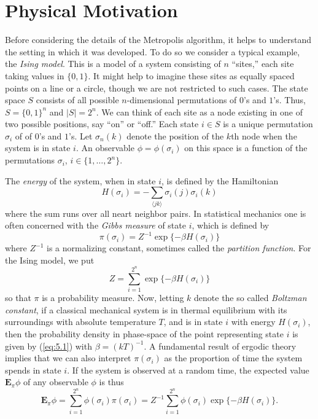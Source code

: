 \documentclass[12pt,letterpaper]{report}
\theoremstyle{plain}
\theoremstyle{definition}
\theoremstyle{remark}
\numberwithin{theorem}{chapter}
\numberwithin{claim}{chapter}
\numberwithin{equation}{chapter}
\numberwithin{conjecture}{chapter}
\newcommand\bE{\ensuremath{\mathbf{E}}}
\newcommand\<{\ensuremath{\langle}}
\renewcommand\>{\ensuremath{\rangle}}
\begin{document}
\section{Physical Motivation}
\label{sec:physical-motivation}
Before considering the details of the Metropolis algorithm, it helps to
understand the setting in which it was developed. To do so we consider a
typical example, the \emph{Ising model}. This is a model of a system consisting
of $n$ ``sites,'' each site taking values in 
$\{0, 1\}$. 
It might 
help to imagine these sites as equally spaced points on a line or a circle,
though we are not restricted to such cases. 
The state space $S$ consists of
all possible $n$-dimensional permutations of $0$'s and $1$'s. 
Thus, $S = \{0, 1\}^n$ and $|S| = 2^n$. We can think of each
site as a node existing in one of two possible positions, say ``on'' or
``off.'' Each state $i \in S$ is %
a unique permutation $\sigma_i$ of of $0$'s and $1$'s. 
Let $\sigma_n(k)$ denote the position %
of the $k$th node when the system is in state $i$. 
An observable $\phi = \phi(\sigma_i)$ on this space is a function of
the permutations $\sigma_i$, $i\in \{1,\dots, 2^n\}$.
%
%
%
%

The \emph{energy} of the system, when in state $i$, is defined by the Hamiltonian
\[
H(\sigma_i) = - \sum_{\<j k\>} \sigma_i(j)\sigma_i(k)
\]
where the sum runs over all neart neighbor pairs. In statistical mechanics one is often concerned
with the \emph{Gibbs measure} of state $i$, which is defined by
\begin{equation}
\label{eq:5.1}
\pi(\sigma_i)= Z^{-1} \exp\{-\beta H(\sigma_i)\}
\end{equation}
where $Z^{-1}$ is a normalizing constant, sometimes called the \emph{partition function}. 
For the Ising model, we put  
\begin{equation*}
Z = \sum_{i=1}^{2^n}\exp\{-\beta H(\sigma_i)\}
\end{equation*}
so that $\pi$ is a probability measure. 
Now, letting $k$ denote the so called \emph{Boltzman constant}, if a
classical mechanical system is in thermal equilibrium with its surroundings with
absolute temperature $T$, and is in state $i$ with energy $H(\sigma_i)$, then the
probability density in phase-space of the point representing state $i$ is given by
(\ref{eq:5.1}) with $\beta = (kT)^{-1}$. A fundamental result of ergodic theory 
implies that we can also interpret $\pi(\sigma_i)$ as the proportion of time the
system spends in state $i$. If the system is observed at a random time, the
expected value $\bE_\pi\phi$ of any observable $\phi$ is thus 
\begin{equation}
\label{eq:5.2}
\bE_\pi\phi = 
\sum_{i=1}^{2^n}\phi(\sigma_i) \pi(\sigma_i) = 
Z^{-1}\sum_{i=1}^{2^n}\phi(\sigma_i) \exp\{-\beta H(\sigma_i)\}.
\end{equation}
\end{document}
